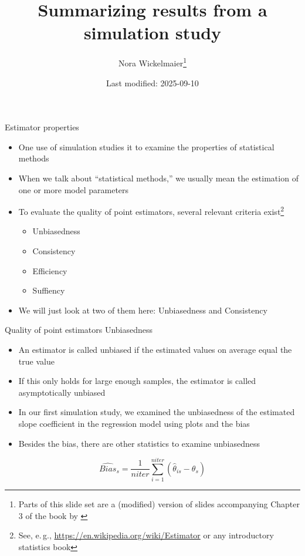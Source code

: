 \documentclass[aspectratio=169]{beamer}
\title{Summarizing results from a simulation study}
\author{Nora Wickelmaier\footnote{Parts of this slide set are a (modified)
version of slides accompanying Chapter 3 of the book by \citet{Strobl2024}}}
\date{Last modified: 2025-09-10}
\begin{document}
\begin{frame}{}
\thispagestyle{empty}
\titlepage
\end{frame}


\begin{frame}{Estimator properties}
  \begin{itemize}
    \item One use of simulation studies it to examine the properties of
      statistical methods
    \item When we talk about ``statistical methods,'' we usually mean the
      estimation of one or more model parameters
    \item To evaluate the quality of point estimators, several relevant criteria
      exist\footnote{See, e.\,g., \url{https://en.wikipedia.org/wiki/Estimator}
      or any introductory statistics book}
      \begin{itemize}
        \item Unbiasedness
        \item Consistency
        \item Efficiency
        \item Suffiency
      \end{itemize}
    \item We will just look at two of them here: Unbiasedness and Consistency
  \end{itemize}
  \vfill
\end{frame}

\begin{frame}{Quality of point estimators}
{Unbiasedness}
  \begin{itemize}
    \item An estimator is called unbiased if the estimated values on average
      equal the true value
    \item If this only holds for large enough samples, the estimator is called
      asymptotically unbiased
    \item In our first simulation study, we examined the unbiasedness of the
      estimated slope coefficient in the regression model using plots and the
      bias
    \item Besides the bias, there are other statistics to examine unbiasedness
  \end{itemize}
  \vspace{.5cm}
  \[
      \widehat{Bias}_s = \frac{1}{niter}{\sum_{i = 1}^{niter}
      \left(\hat{\theta}_{is} - \theta_s\right)}
  \]
\end{frame}
\end{document}
